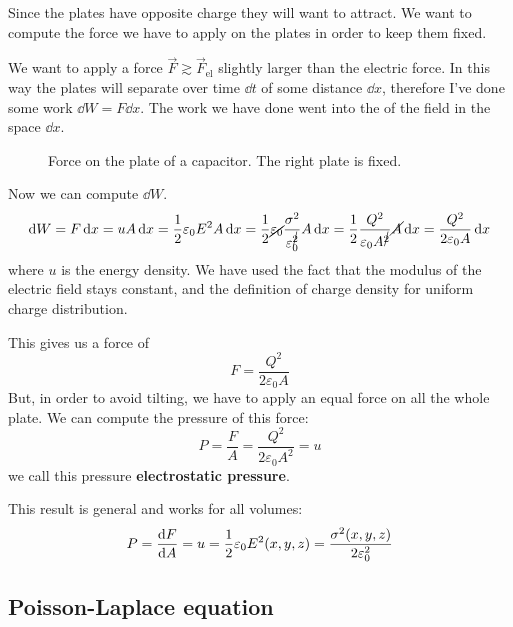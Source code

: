 \documentclass[12pt]{extarticle}
\begin{document}
Since the plates have opposite charge they will want to attract.
We want to compute the force we have to apply on the plates in order to keep them fixed.

We want to apply a force $\vec F \gtrsim \vec F_\text{el}$ slightly larger than the electric force.
In this way the plates will separate over time $\dd{t}$ of some distance $\dd{x}$, therefore I've done some work $\dd{W} = F \dd{x}$.
The work we have done went into the  of the field in the space $\dd{x}$.

\begin{figure}[H]
    \centering
    
    \caption{Force on the plate of a capacitor. The right plate is fixed.}
\end{figure}

Now we can compute $\dd{W}$.
\begin{equation}
    \dd{W} = F \dd{x} = u A \dd{x} = \frac{1}{2} \varepsilon_0 E^2 A \dd{x} = \frac{1}{2} \cancel{\varepsilon_0} \frac{\sigma^2}{\varepsilon_0^{\cancel{2}}} A \dd{x} = \frac{1}{2} \frac{Q^2}{\varepsilon_0 A^{\cancel{2}}} \cancel{A} \dd{x} = \frac{Q^2}{2 \varepsilon_0 A} \dd{x}
\end{equation}
where $u$ is the energy density.
We have used the fact that the modulus of the electric field stays constant, and the definition of charge density for uniform charge distribution.

This gives us a force of
\begin{equation}
    F = \frac{Q^2}{2 \varepsilon_0 A}
\end{equation}
But, in order to avoid tilting, we have to apply an equal force on all the whole plate.
We can compute the pressure of this force:
\begin{equation}
    P = \frac{F}{A} = \frac{Q^2}{2 \varepsilon_0 A^2} = u
\end{equation}
we call this pressure \textbf{electrostatic pressure}.

This result is general and works for all volumes:
\begin{equation}
    P = \dv{F}{A} = u = \frac{1}{2} \varepsilon_0 E^2(x, y, z) = \frac{\sigma^2(x, y, z)}{2 \varepsilon_0^2}
\end{equation}

\subsection{Poisson-Laplace equation}
\end{document}
